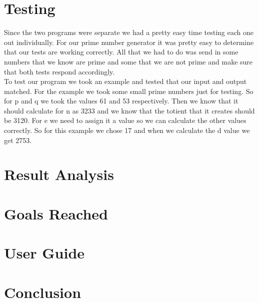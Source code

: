 \documentclass[12pt,journal,compsoc]{IEEEtran}
\begin{document}
\section{Testing}
Since the two programs were separate we had a pretty easy time testing each one out individually. 
For our prime number generator it was pretty easy to determine that our tests are working correctly. All that we had to do was send in some numbers that we know are prime and some that we are not prime and make sure that both tests respond accordingly. \\ \indent
To test our program we took an example and tested that our input and output matched. For the example we took some small prime numbers just for testing. So for p and q we took the values 61 and 53 respectively. Then we know that it should calculate for n as 3233 and we know that the totient that it creates should be 3120. For e we need to assign it a value so we can calculate the other values correctly. So for this example we chose 17 and when we calculate the d value we get 2753.  


\section{Result Analysis}

\section{Goals Reached}

\section{User Guide}

\section{Conclusion}


\appendices

\end{document}
